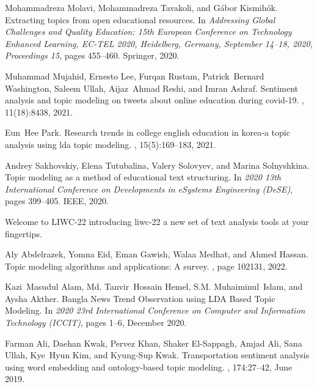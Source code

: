 \begin{thebibliography}{10}
Mohammadreza Molavi, Mohammadreza Tavakoli, and G{\'a}bor Kismih{\'o}k.
\newblock Extracting topics from open educational resources.
\newblock In {\em Addressing Global Challenges and Quality Education: 15th
  European Conference on Technology Enhanced Learning, EC-TEL 2020, Heidelberg,
  Germany, September 14--18, 2020, Proceedings 15}, pages 455--460. Springer,
  2020.

Muhammad Mujahid, Ernesto Lee, Furqan Rustam, Patrick~Bernard Washington,
  Saleem Ullah, Aijaz~Ahmad Reshi, and Imran Ashraf.
\newblock Sentiment analysis and topic modeling on tweets about online
  education during covid-19.
, 11(18):8438, 2021.

Eun~Hee Park.
\newblock Research trends in college english education in korea-a topic
  analysis using lda topic modeling.
, 15(5):169--183, 2021.

Andrey Sakhovskiy, Elena Tutubalina, Valery Solovyev, and Marina Solnyshkina.
\newblock Topic modeling as a method of educational text structuring.
\newblock In {\em 2020 13th International Conference on Developments in
  eSystems Engineering (DeSE)}, pages 399--405. IEEE, 2020.



Welcome to {LIWC}-22 introducing liwc-22 a new set of text analysis tools at
  your fingertips.

Aly Abdelrazek, Yomna Eid, Eman Gawish, Walaa Medhat, and Ahmed Hassan.
\newblock Topic modeling algorithms and applications: A survey.
, page 102131, 2022.

Kazi~Masudul Alam, Md. Tanvir~Hossain Hemel, S.M. Muhaiminul~Islam, and Aysha
  Akther.
\newblock Bangla {News} {Trend} {Observation} using {LDA} {Based} {Topic}
  {Modeling}.
\newblock In {\em 2020 23rd {International} {Conference} on {Computer} and
  {Information} {Technology} ({ICCIT})}, pages 1--6, December 2020.

Farman Ali, Daehan Kwak, Pervez Khan, Shaker El-Sappagh, Amjad Ali, Sana Ullah,
  Kye~Hyun Kim, and Kyung-Sup Kwak.
\newblock Transportation sentiment analysis using word embedding and
  ontology-based topic modeling.
, 174:27--42, June 2019.


\end{thebibliography}
